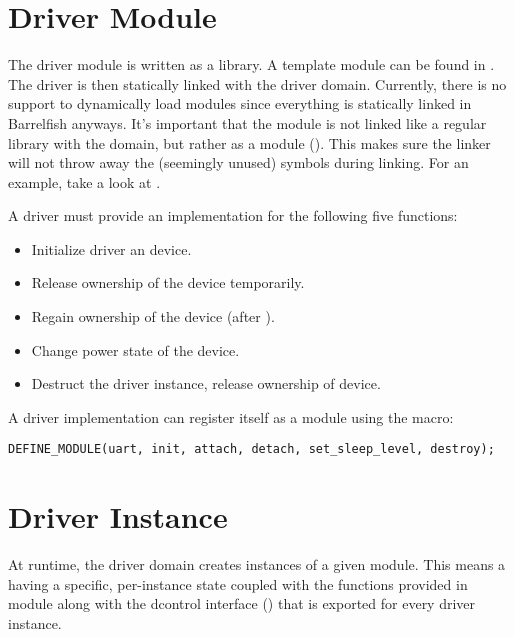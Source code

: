 \documentclass[a4paper,11pt,twoside]{report}
\begin{document}
\section{Driver Module}
\label{sec:module}

The driver module is written as a library. A template module can be found in
. The driver is then statically linked
with the driver domain. Currently, there is no support to dynamically load
modules since everything is statically linked in Barrelfish anyways. It's
important that the module is not linked like a regular library with the domain,
but rather as a module (). This makes sure
the linker will not throw away the (seemingly unused) symbols during linking.
For an example, take a look at .

A driver must provide an implementation for the following five functions:
\begin{itemize}
\item[\fnname{init}] Initialize driver an device.
\item[\fnname{detach}] Release ownership of the device temporarily.
\item[\fnname{attach}] Regain ownership of the device (after ).
\item[\fnname{set\_sleep\_level}] Change power state of the device.
\item[\fnname{destroy}] Destruct the driver instance, release ownership of device.
\end{itemize}

A driver implementation can register itself as a module using the
 macro:
\begin{lstlisting}[caption={Registering an uart driver module}, label={lst:module}]
DEFINE_MODULE(uart, init, attach, detach, set_sleep_level, destroy);
\end{lstlisting}

\section{Driver Instance}
\label{sec:instance}

At runtime, the driver domain creates instances of a given module. This means a
having a specific, per-instance state coupled with the functions provided in
module along with the dcontrol interface () that is
exported for every driver instance.
\end{document}
